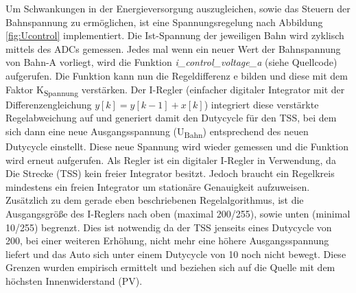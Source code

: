 \documentclass[a4paper, 11pt]{report}
\begin{document}
			Um Schwankungen in der Energieversorgung auszugleichen, sowie das Steuern der Bahnspannung zu ermöglichen, 
			ist eine Spannungsregelung nach Abbildung \ref{fig:Ucontrol} implementiert.
			Die Ist-Spannung der jeweiligen Bahn wird zyklisch mittels des ADCs gemessen. Jedes mal wenn ein neuer Wert der Bahnspannung von Bahn-A vorliegt, 
			wird die Funktion  \emph{i\_control\_voltage\_a} (siehe Quellcode)  aufgerufen. Die Funktion kann nun die Regeldifferenz \glqq e\grqq{} bilden und 
			diese mit dem Faktor \glqq K\textsubscript{Spannung}\grqq{} verstärken.
			Der I-Regler (einfacher digitaler Integrator mit der Differenzengleichung $y[k]=y[k-1]+x[k]$) integriert diese verstärkte Regelabweichung auf und 
			generiert damit den Dutycycle für den TSS, bei dem sich dann eine neue Ausgangsspannung (U\textsubscript{Bahn}) entsprechend des neuen Dutycycle einstellt. 
			Diese neue Spannung wird wieder gemessen und die Funktion wird erneut aufgerufen.
			Als Regler ist ein digitaler I-Regler in Verwendung, da Die Strecke (TSS) kein freier Integrator besitzt. 
			Jedoch braucht ein Regelkreis mindestens ein freien Integrator um stationäre Genauigkeit aufzuweisen.
			Zusätzlich zu dem gerade eben beschriebenen Regelalgorithmus, ist die Ausgangsgröße des I-Reglers nach oben (maximal 200/255), 
			sowie unten (minimal 10/255) begrenzt. Dies ist notwendig da der TSS jenseits eines Dutycycle von 200, bei einer weiteren Erhöhung, 
			nicht mehr eine höhere Ausgangsspannung liefert und das Auto sich unter einem Dutycycle von 10 noch nicht bewegt. 
			Diese Grenzen wurden empirisch ermittelt und beziehen sich auf die Quelle mit dem höchsten Innenwiderstand (PV).
\end{document}
